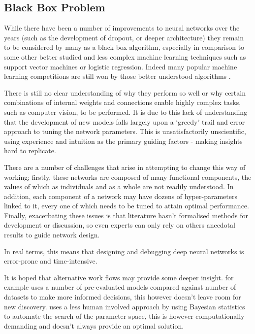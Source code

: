 \documentclass[a4paper,11pt,titlepage]{article}
\begin{document}
	\subsection{Black Box Problem}
		While there have been a number of improvements to neural networks over the years (such as the development of dropout, or deeper architecture) they remain to be considered by many as a black box algorithm, especially in comparison to some other better studied and less complex machine learning techniques such as support vector machines or logistic regression. Indeed many popular machine learning competitions are still won by those better understood algorithms \cite{Adams2015}.
		\par 
		There is still no clear understanding of why they perform so well or why certain combinations of internal weights and connections enable highly complex tasks, such as computer vision, to be performed. It is due to this lack of understanding that the development of new models falls largely upon a `greedy' trail and error approach to tuning the network parameters. This is unsatisfactorily unscientific, using experience and intuition as the primary guiding factors - making insights hard to replicate.
		\par
		There are a number of challenges that arise in attempting to change this way of working; firstly, these networks are composed of many functional components, the values of which as individuals and as a whole are not readily understood. In addition, each component of a network may have dozens of hyper-parameters linked to it, every one of which needs to be tuned to attain optimal performance. Finally, exacerbating these issues is that literature hasn't formalised methods for development or discussion, so even experts can only rely on others anecdotal results to guide network design.
		\par 
		In real terms, this means that designing and debugging deep neural networks is error-prone and time-intensive. 
		\par 
		It is hoped that alternative work flows may provide some deeper insight. \cite{Jarrett2009} for example uses a number of pre-evaluated models compared against number of datasets to make more informed decisions, this however doesn't leave room for new discovery. \cite{Bergstra2013} uses a less human involved approach by using Bayesian statistics to automate the search of the parameter space, this is however computationally demanding and doesn't always provide an optimal solution. 
		\par 
\end{document}

